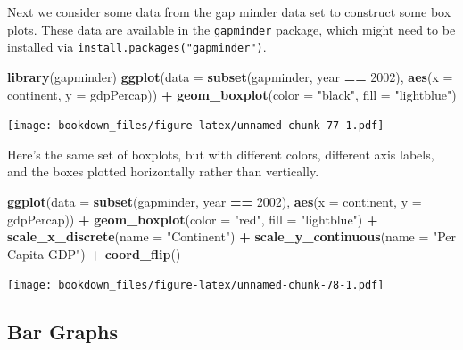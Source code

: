 \documentclass[
]{krantz}
\makeatletter
\newenvironment{Shaded}{\begin{snugshade}}{\end{snugshade}}
\newcommand{\DataTypeTok}[1]{\textcolor[rgb]{0.27,0.27,0.27}{#1}}
\newcommand{\DecValTok}[1]{\textcolor[rgb]{0.06,0.06,0.06}{#1}}
\newcommand{\KeywordTok}[1]{\textcolor[rgb]{0.27,0.27,0.27}{\textbf{#1}}}
\newcommand{\NormalTok}[1]{#1}
\newcommand{\OperatorTok}[1]{\textcolor[rgb]{0.43,0.43,0.43}{\textbf{#1}}}
\newcommand{\StringTok}[1]{\textcolor[rgb]{0.5,0.5,0.5}{#1}}
\newenvironment{kframe}{%
\medskip{}
\setlength{\fboxsep}{.8em}
 \def\at@end@of@kframe{}%
 \ifinner\ifhmode%
  \def\at@end@of@kframe{\end{minipage}}%
  \begin{minipage}{\columnwidth}%
 \fi\fi%
 \def\FrameCommand##1{\hskip\@totalleftmargin \hskip-\fboxsep
 \colorbox{shadecolor}{##1}\hskip-\fboxsep
     \hskip-\linewidth \hskip-\@totalleftmargin \hskip\columnwidth}%
 \MakeFramed {\advance\hsize-\width
   \@totalleftmargin\z@ \linewidth\hsize
   \@setminipage}}%
 {\par\unskip\endMakeFramed%
 \at@end@of@kframe}
\renewenvironment{Shaded}{\begin{kframe}}{\end{kframe}}
\makeatother
\begin{document}
Next we consider some data from the gap minder data set to construct some box plots. These data are available in the \texttt{gapminder} package, which might need to be installed via \texttt{install.packages("gapminder")}.

\begin{Shaded}
\begin{Highlighting}[]
\KeywordTok{library}\NormalTok{(gapminder)}
\KeywordTok{ggplot}\NormalTok{(}\DataTypeTok{data =} \KeywordTok{subset}\NormalTok{(gapminder,  year }\OperatorTok{==}\StringTok{ }\DecValTok{2002}\NormalTok{), }
       \KeywordTok{aes}\NormalTok{(}\DataTypeTok{x =}\NormalTok{ continent, }\DataTypeTok{y =}\NormalTok{ gdpPercap)) }\OperatorTok{+}\StringTok{ }
\StringTok{    }\KeywordTok{geom\_boxplot}\NormalTok{(}\DataTypeTok{color =} \StringTok{"black"}\NormalTok{, }\DataTypeTok{fill =} \StringTok{"lightblue"}\NormalTok{)}
\end{Highlighting}
\end{Shaded}

\texttt{[image: bookdown\_files/figure-latex/unnamed-chunk-77-1.pdf]}

Here's the same set of boxplots, but with different colors, different axis labels, and the boxes plotted horizontally rather than vertically.

\begin{Shaded}
\begin{Highlighting}[]
\KeywordTok{ggplot}\NormalTok{(}\DataTypeTok{data =} \KeywordTok{subset}\NormalTok{(gapminder,  year }\OperatorTok{==}\StringTok{ }\DecValTok{2002}\NormalTok{), }
       \KeywordTok{aes}\NormalTok{(}\DataTypeTok{x =}\NormalTok{ continent, }\DataTypeTok{y =}\NormalTok{ gdpPercap)) }\OperatorTok{+}\StringTok{ }
\StringTok{    }\KeywordTok{geom\_boxplot}\NormalTok{(}\DataTypeTok{color =} \StringTok{"red"}\NormalTok{, }\DataTypeTok{fill =} \StringTok{"lightblue"}\NormalTok{) }\OperatorTok{+}\StringTok{ }
\StringTok{    }\KeywordTok{scale\_x\_discrete}\NormalTok{(}\DataTypeTok{name =} \StringTok{"Continent"}\NormalTok{) }\OperatorTok{+}\StringTok{ }
\StringTok{    }\KeywordTok{scale\_y\_continuous}\NormalTok{(}\DataTypeTok{name =} \StringTok{"Per Capita GDP"}\NormalTok{) }\OperatorTok{+}\StringTok{ }\KeywordTok{coord\_flip}\NormalTok{()}
\end{Highlighting}
\end{Shaded}

\texttt{[image: bookdown\_files/figure-latex/unnamed-chunk-78-1.pdf]}

\hypertarget{bar-graphs}{%
\subsection{Bar Graphs}\label{bar-graphs}}
\end{document}
